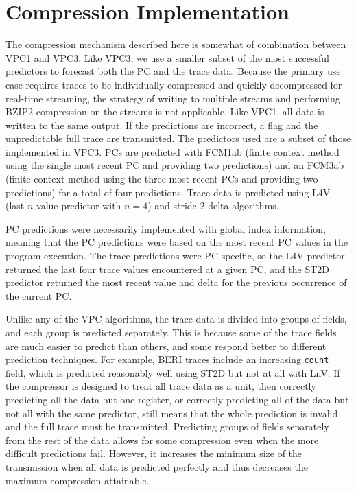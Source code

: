 \documentclass[conference]{IEEEtran}
\begin{document}
\section{Compression Implementation}
The compression mechanism described here is somewhat of combination between VPC1 and VPC3. Like VPC3, we use a smaller subset of the most successful predictors to forecast both the PC and the trace data. Because the primary use case requires traces to be individually compressed and quickly decompressed for real-time streaming, the strategy of writing to multiple streams and performing BZIP2 compression on the streams is not applicable. Like VPC1, all data is written to the same output. If the predictions are incorrect, a flag and the unpredictable full trace are transmitted. The predictors used are a subset of those implemented in VPC3. PCs are predicted with FCM1ab (finite context method using the single most recent PC and providing two predictions) and an FCM3ab (finite context method using the three most recent PCs and providing two predictions) for a total of four predictions. Trace data is predicted using L4V (last $n$ value predictor with $n=4$) and stride 2-delta algorithms. 

PC predictions were necessarily implemented with global index information, meaning that the PC predictions were based on the most recent PC values in the program execution. The trace predictions were PC-specific, so the L4V predictor returned the last four trace values encountered at a given PC, and the ST2D predictor returned the most recent value and delta for the previous occurrence of the current PC.  

Unlike any of the VPC algorithms, the trace data is divided into groups of fields, and each group is predicted separately. This is because some of the trace fields are much easier to predict than others, and some respond better to different prediction techniques. For example, BERI traces include an increasing \texttt{count} field, which is predicted reasonably well using ST2D but not at all with LnV. If the compressor is designed to treat all trace data as a unit, then correctly predicting all the data but one register, or correctly predicting all of the data but not all with the same predictor, still means that the whole prediction is invalid and the full trace must be transmitted. Predicting groups of fields separately from the rest of the data allows for some compression even when the more difficult predictions fail. However, it increases the minimum size of the transmission when all data is predicted perfectly and thus decreases the maximum compression attainable. 
\end{document}
